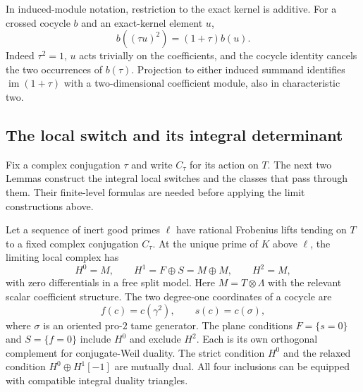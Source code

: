 In induced-module notation, restriction to the exact kernel is additive.
For a crossed cocycle $b$ and an exact-kernel element $u$,
\[
 b((\tau u)^2)=(1+\tau)b(u).
\]
Indeed $\tau^2=1$, $u$ acts trivially on the coefficients, and the
cocycle identity cancels the two occurrences of $b(\tau)$.  Projection
to either induced summand identifies $\operatorname{im}(1+\tau)$
with a two-dimensional coefficient module, also in characteristic two.

\subsection{The local switch and its integral determinant}
\label{rd:local-subsection}

Fix a complex conjugation $\tau$ and write $C_\tau$ for its action on $T$.
The next two Lemmas construct the integral local switches and the classes
that pass through them. Their finite-level formulas are needed before
applying the limit constructions above.

\begin{lemma}\label{rd:local-model}\label{lem:h:switching-pairing}
Let a sequence of inert good primes \(\ell\) have rational Frobenius
lifts tending on \(T\) to a fixed complex conjugation \(C_\tau\).
At the unique prime of \(K\) above \(\ell\), the limiting local complex
has
\begin{equation}
 H^0=M,\qquad H^1=F\oplus S=M\oplus M,\qquad H^2=M,
 \label{rd:local-cohomology}
\end{equation}
with zero differentials in a free split model.  Here \(M=T\otimes\Lambda\)
with the relevant scalar coefficient structure.  The two degree-one
coordinates of a cocycle are
\begin{equation}
 f(c)=c(\gamma^2),\qquad s(c)=c(\sigma),
 \label{eq:h:local-coordinates}
\end{equation}
where \(\sigma\) is an oriented pro-\(2\) tame generator.  The plane
conditions \(F=\{s=0\}\) and \(S=\{f=0\}\) include \(H^0\) and exclude
\(H^2\).  Each is its own orthogonal complement for conjugate-Weil
duality.  The strict condition \(H^0\) and the relaxed condition
\(H^0\oplus H^1[-1]\) are mutually dual.  All four inclusions can be
equipped with compatible integral duality triangles.
\end{lemma}

